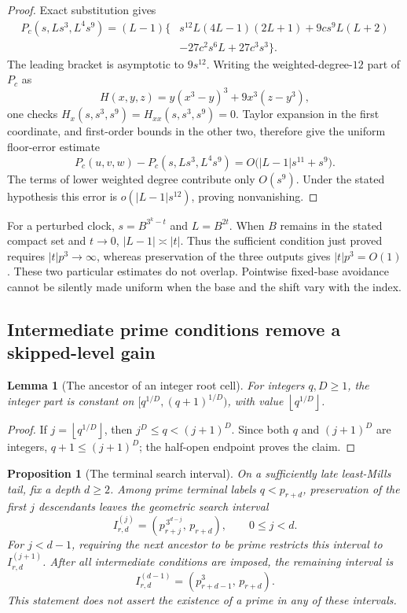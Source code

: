 \documentclass[11pt,a4paper]{article}
\numberwithin{equation}{section}
\newtheorem{lemma}[theorem]{Lemma}
\newtheorem{proposition}[theorem]{Proposition}
\theoremstyle{definition}
\theoremstyle{remark}
\newcommand{\floor}[1]{\left\lfloor #1\right\rfloor}
\begin{document}
\begin{proof}
Exact substitution gives
\begin{align*}
 P_c(s,Ls^3,L^4s^9)
 =(L-1)\bigl\{&
 s^{12}L(4L-1)(2L+1)
 +9cs^9L(L+2)\\
 &-27c^2s^6L+27c^3s^3\bigr\}.
\end{align*}
The leading bracket is asymptotic to \(9s^{12}\).
Writing the weighted-degree-\(12\) part of \(P_c\) as
\[
 H(x,y,z)=y(x^3-y)^3+9x^3(z-y^3),
\]
one checks \(H_x(s,s^3,s^9)=H_{xx}(s,s^3,s^9)=0\).
Taylor expansion in the first coordinate, and first-order
bounds in the other two, therefore give the uniform floor-error
estimate
\[
 P_c(u,v,w)-P_c(s,Ls^3,L^4s^9)
 =O\bigl(|L-1|s^{11}+s^9\bigr).
\]
The terms of lower weighted degree contribute only \(O(s^9)\).
Under the stated hypothesis this error is
\(o(|L-1|s^{12})\), proving nonvanishing.
\end{proof}

For a perturbed clock, \(s=B^{3^k-t}\) and \(L=B^{2t}\).
When \(B\) remains in the stated compact set and \(t\to0\),
\(|L-1|\asymp|t|\). Thus the sufficient condition just proved
requires \(|t|p^3\to\infty\), whereas preservation of the three
outputs gives \(|t|p^3=O(1)\).
These two particular estimates do not overlap.
Pointwise fixed-base avoidance cannot be silently made uniform
when the base and the shift vary with the index.

\subsection{Intermediate prime conditions remove a skipped-level gain}
\label{mi:corridor}

\begin{lemma}[The ancestor of an integer root cell]
\label{mi:ancestor}
For integers \(q,D\ge1\), the integer part is constant on
\([q^{1/D},(q+1)^{1/D})\), with value
\(\floor{q^{1/D}}\).
\end{lemma}

\begin{proof}
If \(j=\floor{q^{1/D}}\), then
\(j^D\le q<(j+1)^D\). Since both \(q\) and \((j+1)^D\)
are integers, \(q+1\le(j+1)^D\); the half-open endpoint proves
the claim.
\end{proof}

\begin{proposition}[The terminal search interval]
\label{mi:terminal}
On a sufficiently late least-Mills tail, fix a depth \(d\ge2\).
Among prime terminal labels \(q<p_{r+d}\), preservation of the first
\(j\) descendants leaves the geometric search interval
\[
 I_{r,d}^{(j)}
   =(p_{r+j}^{\,3^{d-j}},\,p_{r+d}),
 \qquad 0\le j<d.
\]
For \(j<d-1\), requiring the next ancestor to be prime restricts
this interval to \(I_{r,d}^{(j+1)}\).
After all intermediate conditions are imposed, the remaining
interval is
\[
 I_{r,d}^{(d-1)}=(p_{r+d-1}^3,\,p_{r+d}).
\]
This statement does not assert the existence of a prime in any
of these intervals.
\end{proposition}
\end{document}

